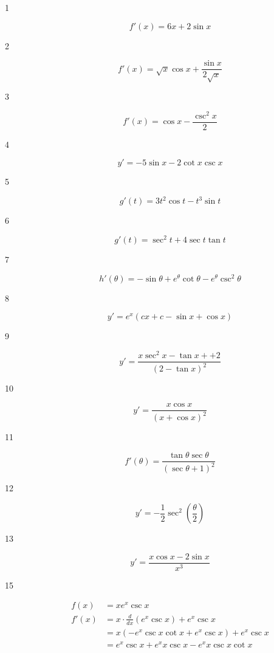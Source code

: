 \documentclass[letterpaper, landscape]{exam}
\begin{document}
  \begin{description}

    \item[1] 
      \[
        f'(x) = 6x + 2 \sin x
      \]

    \item[2] 
      \[
        f'(x) = \sqrt{x} \cos{x} + \frac{\sin{x}}{2 \sqrt{x}}
      \]

    \item[3] 
      \[
        f'(x) = \cos x - \frac{\csc^2 x}{2}
      \]

    \item[4] 
      \[
        y' = - 5 \sin x - 2 \cot x \csc x
      \]

    \item[5] 
      \[
        g'(t) = 3t^2 \cos t - t^3 \sin t
      \]

    \item[6] 
      \[
        g'(t) = \sec^2 t + 4 \sec t \tan t
      \]

    \item[7] 
      \[
        h'(\theta) = - \sin \theta + e^{\theta} \cot \theta - e^{\theta} \csc^2 \theta
      \]

    \item[8] 
      \[
        y' = e^x (c x + c - \sin x + \cos x)
      \]

    \item[9] 
      \[
        y' = \frac{ x \sec ^2 x - \tan x +  + 2}{( 2 - \tan x )^2}
      \]

    \item[10] 
      \[
        y' = \frac{x \cos x}{(x + \cos x)^2}
      \]

    \item[11] 
      \[
        f'(\theta) = \frac{\tan \theta \sec \theta}{(\sec \theta + 1)^2}
      \]

    \item[12] 
      \[
        y' = -\frac{1}{2} \sec ^2\left(\frac{\theta }{2}\right)
      \]

    \item[13] 
      \[
        y' = \frac{x \cos x - 2 \sin x}{x^3}
      \]

    \item[15] 
      \begin{align*}
        f(x)  & = x e^x \csc x \\
        f'(x) & = x \cdot \frac{d}{dx} \left( e^x \csc x \right) + e^x \csc x \\
              & = x \left( - e^x \csc x \cot x + e^x \csc x  \right)+ e^x \csc x \\
              & = e^x \csc x + e^x x \csc x - e^x x \csc x \cot x \\
      \end{align*}


\end{description}
\end{document}
